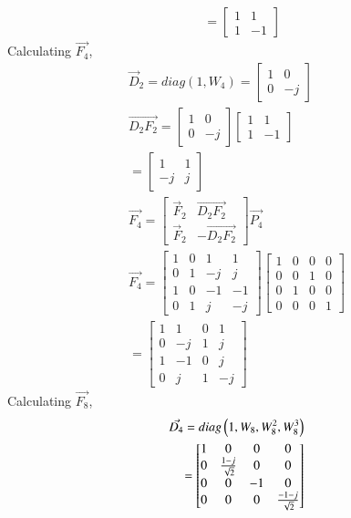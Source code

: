 \documentclass[journal,12pt,twocolumn]{IEEEtran}
\renewcommand\thesection{\arabic{section}}
\begin{document}
\begin{enumerate}[label=\arabic*.,ref=\thesection.\theenumi]
\begin{solution}
\begin{align}
&=\begin{bmatrix}1&1\\1&-1\end{bmatrix}
\end{align}
Calculating $\vec{F_4}$,
\begin{align}
\vec{D}_{2}=diag(1,W_4)
=\begin{bmatrix}
1&0\\0&-j
\end{bmatrix}\\
\vec{D_2F_2}=\begin{bmatrix}
1&0\\0&-j
\end{bmatrix}\begin{bmatrix}
1&1\\1&-1
\end{bmatrix}\\
=\begin{bmatrix}
1&1\\-j&j
\end{bmatrix}\\
\vec{F_4}=\begin{bmatrix}
\vec{F}_{2} & \vec{D_2F_2} \\
\vec{F}_{2} & -\vec{D_2F_2}
\end{bmatrix}\vec{P_4}\\
\vec{F_4}=\begin{bmatrix}
1&0&1&1\\0&1&-j&j\\1&0&-1&-1\\0&1&j&-j
\end{bmatrix}\begin{bmatrix}
1&0&0&0\\0&0&1&0\\0&1&0&0\\0&0&0&1
\end{bmatrix}\\
=\begin{bmatrix}
1&1&0&1\\0&-j&1&j\\1&-1&0&j\\0&j&1&-j
\end{bmatrix}
\end{align}
Calculating $\vec{F_8}$,
\begin{align}
\vec{D_4}=diag\left(1,W_8,W_8^2,W_8^3\right)\\
=\begin{bmatrix}
1&0&0&0\\0&\frac{1-j}{\sqrt{2}}&0&0\\0&0&-1&0\\0&0&0&\frac{-1-j}{\sqrt{2}}

\end{bmatrix}
\end{align}
\end{solution}
\end{enumerate}
\end{document}
